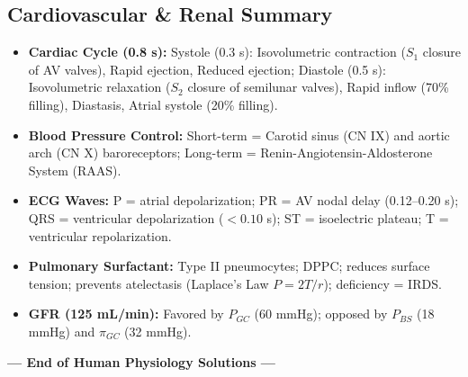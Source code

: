 \documentclass[11pt,a4paper]{article}
\begin{document}
\subsection{Cardiovascular \& Renal Summary}
\begin{itemize}[leftmargin=*]
    \item \textbf{Cardiac Cycle (0.8 s):} Systole (0.3 s): Isovolumetric contraction ($S_1$ closure of AV valves), Rapid ejection, Reduced ejection; Diastole (0.5 s): Isovolumetric relaxation ($S_2$ closure of semilunar valves), Rapid inflow (70\% filling), Diastasis, Atrial systole (20\% filling).
    \item \textbf{Blood Pressure Control:} Short-term = Carotid sinus (CN IX) and aortic arch (CN X) baroreceptors; Long-term = Renin-Angiotensin-Aldosterone System (RAAS).
    \item \textbf{ECG Waves:} P = atrial depolarization; PR = AV nodal delay (0.12--0.20 s); QRS = ventricular depolarization ($<0.10$ s); ST = isoelectric plateau; T = ventricular repolarization.
    \item \textbf{Pulmonary Surfactant:} Type II pneumocytes; DPPC; reduces surface tension; prevents atelectasis (Laplace's Law $P=2T/r$); deficiency = IRDS.
    \item \textbf{GFR (125 mL/min):} Favored by $P_{GC}$ (60 mmHg); opposed by $P_{BS}$ (18 mmHg) and $\pi_{GC}$ (32 mmHg).
\end{itemize}

\vspace{1cm}
\begin{center}
\textbf{--- End of Human Physiology Solutions ---}
\end{center}
\end{document}
